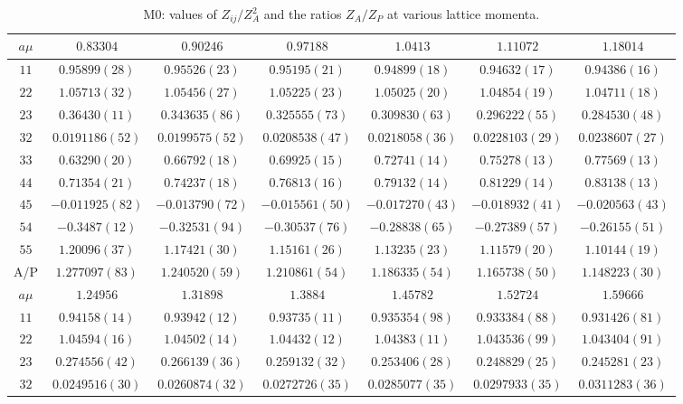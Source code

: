 \begin{table}
\begin{center}
\caption{M0: values of $Z_{ij}/Z_A^2$ and the ratios $Z_A/Z_P$ at various lattice momenta.}
\begin{tabular}{c|c c c c c c}
\hline
\hline
$a\mu$ & $0.83304$ & $0.90246$ & $0.97188$ & $1.0413$ & $1.11072$ & $1.18014$ \\
\hline
$11$ & $0.95899(28)$ & $0.95526(23)$ & $0.95195(21)$ & $0.94899(18)$ & $0.94632(17)$ & $0.94386(16)$ \\
$22$ & $1.05713(32)$ & $1.05456(27)$ & $1.05225(23)$ & $1.05025(20)$ & $1.04854(19)$ & $1.04711(18)$ \\
$23$ & $0.36430(11)$ & $0.343635(86)$ & $0.325555(73)$ & $0.309830(63)$ & $0.296222(55)$ & $0.284530(48)$ \\
$32$ & $0.0191186(52)$ & $0.0199575(52)$ & $0.0208538(47)$ & $0.0218058(36)$ & $0.0228103(29)$ & $0.0238607(27)$ \\
$33$ & $0.63290(20)$ & $0.66792(18)$ & $0.69925(15)$ & $0.72741(14)$ & $0.75278(13)$ & $0.77569(13)$ \\
$44$ & $0.71354(21)$ & $0.74237(18)$ & $0.76813(16)$ & $0.79132(14)$ & $0.81229(14)$ & $0.83138(13)$ \\
$45$ & $-0.011925(82)$ & $-0.013790(72)$ & $-0.015561(50)$ & $-0.017270(43)$ & $-0.018932(41)$ & $-0.020563(43)$ \\
$54$ & $-0.3487(12)$ & $-0.32531(94)$ & $-0.30537(76)$ & $-0.28838(65)$ & $-0.27389(57)$ & $-0.26155(51)$ \\
$55$ & $1.20096(37)$ & $1.17421(30)$ & $1.15161(26)$ & $1.13235(23)$ & $1.11579(20)$ & $1.10144(19)$ \\
\hline
A/P & $1.277097(83)$ & $1.240520(59)$ & $1.210861(54)$ & $1.186335(54)$ & $1.165738(50)$ & $1.148223(30)$ \\
\hline
$a\mu$ & $1.24956$ & $1.31898$ & $1.3884$ & $1.45782$ & $1.52724$ & $1.59666$ \\
\hline
$11$ & $0.94158(14)$ & $0.93942(12)$ & $0.93735(11)$ & $0.935354(98)$ & $0.933384(88)$ & $0.931426(81)$ \\
$22$ & $1.04594(16)$ & $1.04502(14)$ & $1.04432(12)$ & $1.04383(11)$ & $1.043536(99)$ & $1.043404(91)$ \\
$23$ & $0.274556(42)$ & $0.266139(36)$ & $0.259132(32)$ & $0.253406(28)$ & $0.248829(25)$ & $0.245281(23)$ \\
$32$ & $0.0249516(30)$ & $0.0260874(32)$ & $0.0272726(35)$ & $0.0285077(35)$ & $0.0297933(35)$ & $0.0311283(36)$ \\

\end{tabular}
\end{center}
\end{table}
